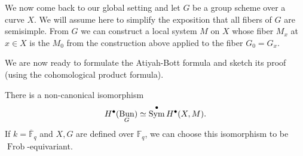 \documentclass[oneside]{amsart}
\newcommand{\F}{\mathbb{F}}
\DeclareMathOperator{\Bun}{Bun}
\DeclareMathOperator{\Frob}{Frob}
\DeclareMathOperator{\Sym}{Sym}
\begin{document}
We now come back to our global setting and let $G$ be a group scheme over a curve $X$. We will assume here to simplify the exposition that all fibers of $G$ are semisimple.  From $G$ we can construct a local system $M$ on $X$ whose fiber $M_x$ at $x\in X$ is the $M_0$ from the construction above applied to the fiber $G_0 = G_x$.

We are now ready to formulate the Atiyah-Bott formula and sketch its proof (using the cohomological product formula).

\begin{theorem} \label{thm:atiyah-bott}
There is a non-canonical isomorphism
	\[
	H^{\bullet}(\Bun_G) \isoto \Sym^{\bullet}H^{\bullet}(X,M).
	\] 
If $k=\overline{\F}_q$ and $X,G$ are defined over $\F_q$, we can choose this isomorphism to be $\Frob$-equivariant.
\end{theorem}
\end{document}
